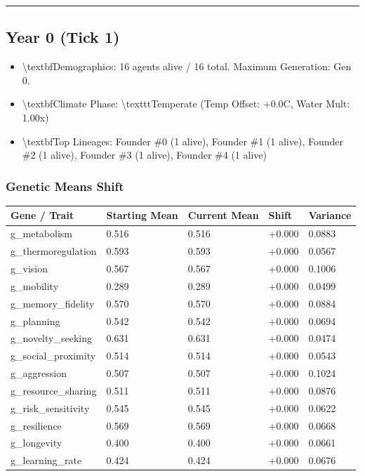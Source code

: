 \documentclass[11pt,a4paper]{article}
\begin{document}
\noindent\rule{\textwidth}{0.4pt}

\subsection*{ Year 0 (Tick 1)}
\begin{itemize}
  \item \textbackslash{}textbf{Demographics:} 16 agents alive / 16 total. Maximum Generation: Gen 0.
  \item \textbackslash{}textbf{Climate Phase:} \textbackslash{}texttt{Temperate} (Temp Offset: +0.0C, Water Mult: 1.00x)
  \item \textbackslash{}textbf{Top Lineages:} Founder \#0 (1 alive), Founder \#1 (1 alive), Founder \#2 (1 alive), Founder \#3 (1 alive), Founder \#4 (1 alive)
\end{itemize}

\subsubsection*{ Genetic Means Shift}
\begin{longtable}{lllll}
\toprule
Gene / Trait & Starting Mean & Current Mean & Shift & Variance \\
\midrule
\endhead
g\_metabolism & 0.516 & 0.516 & +0.000 & 0.0883 \\
g\_thermoregulation & 0.593 & 0.593 & +0.000 & 0.0567 \\
g\_vision & 0.567 & 0.567 & +0.000 & 0.1006 \\
g\_mobility & 0.289 & 0.289 & +0.000 & 0.0499 \\
g\_memory\_fidelity & 0.570 & 0.570 & +0.000 & 0.0884 \\
g\_planning & 0.542 & 0.542 & +0.000 & 0.0694 \\
g\_novelty\_seeking & 0.631 & 0.631 & +0.000 & 0.0474 \\
g\_social\_proximity & 0.514 & 0.514 & +0.000 & 0.0543 \\
g\_aggression & 0.507 & 0.507 & +0.000 & 0.1024 \\
g\_resource\_sharing & 0.511 & 0.511 & +0.000 & 0.0876 \\
g\_risk\_sensitivity & 0.545 & 0.545 & +0.000 & 0.0622 \\
g\_resilience & 0.569 & 0.569 & +0.000 & 0.0668 \\
g\_longevity & 0.400 & 0.400 & +0.000 & 0.0661 \\
g\_learning\_rate & 0.424 & 0.424 & +0.000 & 0.0676 \\
\bottomrule
\end{longtable}
\end{document}
